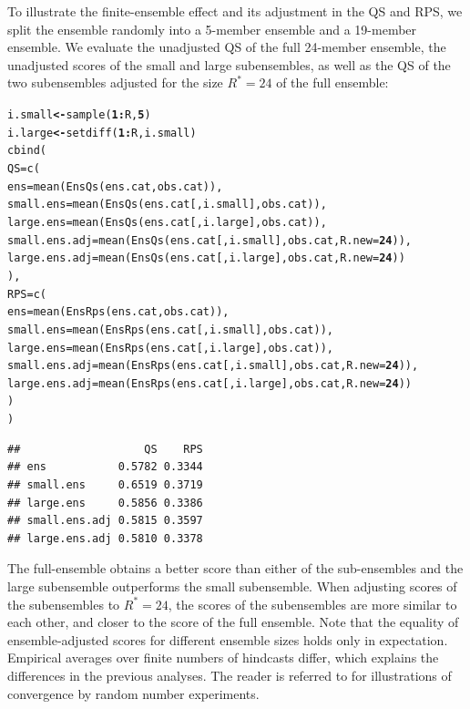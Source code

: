 \documentclass[article]{jss}\usepackage[]{graphicx}\usepackage[]{color}
\makeatletter
\newcommand{\hlnum}[1]{\textcolor[rgb]{0.502,0,0.502}{\textbf{#1}}}%
\newcommand{\hlopt}[1]{\textcolor[rgb]{1,0,0.502}{\textbf{#1}}}%
\newcommand{\hlstd}[1]{\textcolor[rgb]{0,0,0}{#1}}%
\newcommand{\hlkwb}[1]{\textcolor[rgb]{0.502,0.502,0.753}{\textbf{#1}}}%
\newcommand{\hlkwc}[1]{\textcolor[rgb]{0,0.502,0.753}{#1}}%
\newcommand{\hlkwd}[1]{\textcolor[rgb]{0,0.267,0.4}{#1}}%
\newenvironment{kframe}{%
 \def\at@end@of@kframe{}%
 \ifinner\ifhmode%
  \def\at@end@of@kframe{\end{minipage}}%
  \begin{minipage}{\columnwidth}%
 \fi\fi%
 \def\FrameCommand##1{\hskip\@totalleftmargin \hskip-\fboxsep
 \colorbox{shadecolor}{##1}\hskip-\fboxsep
     \hskip-\linewidth \hskip-\@totalleftmargin \hskip\columnwidth}%
 \MakeFramed {\advance\hsize-\width
   \@totalleftmargin\z@ \linewidth\hsize
   \@setminipage}}%
 {\par\unskip\endMakeFramed%
 \at@end@of@kframe}
\newenvironment{knitrout}{}{} %
\makeatother
\begin{document}
To illustrate the finite-ensemble effect and its adjustment in the QS and RPS, we split the ensemble randomly into a 5-member ensemble and a 19-member ensemble. 
We evaluate the unadjusted QS of the full 24-member ensemble, the unadjusted scores of the small and large subensembles, as well as the QS of the two subensembles adjusted for the size $R^*=24$ of the full ensemble:
%
\begin{knitrout}
\color{fgcolor}\begin{kframe}
\begin{alltt}
\hlstd{i.small} \hlkwb{<-} \hlkwd{sample}\hlstd{(}\hlnum{1}\hlopt{:}\hlstd{R,} \hlnum{5}\hlstd{)}
\hlstd{i.large} \hlkwb{<-} \hlkwd{setdiff}\hlstd{(}\hlnum{1}\hlopt{:}\hlstd{R, i.small)}
\hlkwd{cbind}\hlstd{(}
 \hlkwc{QS} \hlstd{=} \hlkwd{c}\hlstd{(}
  \hlkwc{ens}           \hlstd{=} \hlkwd{mean}\hlstd{(}\hlkwd{EnsQs}\hlstd{(ens.cat,            obs.cat)),}
  \hlkwc{small.ens}     \hlstd{=} \hlkwd{mean}\hlstd{(}\hlkwd{EnsQs}\hlstd{(ens.cat[, i.small], obs.cat)),}
  \hlkwc{large.ens}     \hlstd{=} \hlkwd{mean}\hlstd{(}\hlkwd{EnsQs}\hlstd{(ens.cat[, i.large], obs.cat)),}
  \hlkwc{small.ens.adj} \hlstd{=} \hlkwd{mean}\hlstd{(}\hlkwd{EnsQs}\hlstd{(ens.cat[, i.small], obs.cat,} \hlkwc{R.new}\hlstd{=}\hlnum{24}\hlstd{)),}
  \hlkwc{large.ens.adj} \hlstd{=} \hlkwd{mean}\hlstd{(}\hlkwd{EnsQs}\hlstd{(ens.cat[, i.large], obs.cat,} \hlkwc{R.new}\hlstd{=}\hlnum{24}\hlstd{))}
 \hlstd{),}
 \hlkwc{RPS} \hlstd{=} \hlkwd{c}\hlstd{(}
  \hlkwc{ens}           \hlstd{=} \hlkwd{mean}\hlstd{(}\hlkwd{EnsRps}\hlstd{(ens.cat,            obs.cat)),}
  \hlkwc{small.ens}     \hlstd{=} \hlkwd{mean}\hlstd{(}\hlkwd{EnsRps}\hlstd{(ens.cat[, i.small], obs.cat)),}
  \hlkwc{large.ens}     \hlstd{=} \hlkwd{mean}\hlstd{(}\hlkwd{EnsRps}\hlstd{(ens.cat[, i.large], obs.cat)),}
  \hlkwc{small.ens.adj} \hlstd{=} \hlkwd{mean}\hlstd{(}\hlkwd{EnsRps}\hlstd{(ens.cat[, i.small], obs.cat,} \hlkwc{R.new}\hlstd{=}\hlnum{24}\hlstd{)),}
  \hlkwc{large.ens.adj} \hlstd{=} \hlkwd{mean}\hlstd{(}\hlkwd{EnsRps}\hlstd{(ens.cat[, i.large], obs.cat,} \hlkwc{R.new}\hlstd{=}\hlnum{24}\hlstd{))}
 \hlstd{)}
\hlstd{)}
\end{alltt}
\begin{verbatim}
##                   QS    RPS
## ens           0.5782 0.3344
## small.ens     0.6519 0.3719
## large.ens     0.5856 0.3386
## small.ens.adj 0.5815 0.3597
## large.ens.adj 0.5810 0.3378
\end{verbatim}
\end{kframe}
\end{knitrout}
%
The full-ensemble obtains a better score than either of the sub-ensembles and the large subensemble outperforms the small subensemble.
When adjusting scores of the subensembles to $R^*=24$, the scores of the subensembles are more similar to each other, and closer to the score of the full ensemble.
Note that the equality of ensemble-adjusted scores for different ensemble sizes holds only in expectation. 
Empirical averages over finite numbers of hindcasts differ, which explains the differences in the previous analyses.
The reader is referred to \citet{ferro2013fair} for illustrations of convergence by random number experiments.
\end{document}
